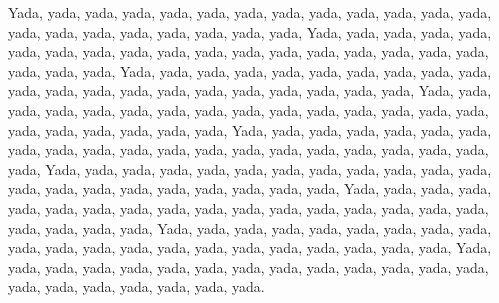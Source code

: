 Yada, yada, yada, yada, yada, yada, yada, yada, yada, yada, yada, yada, yada, yada, yada, yada, yada, yada, yada, yada, yada,
Yada, yada, yada, yada, yada, yada, yada, yada, yada, yada, yada, yada, yada, yada, yada, yada, yada, yada, yada, yada, yada,
Yada, yada, yada, yada, yada, yada, yada, yada, yada, yada, yada, yada, yada, yada, yada, yada, yada, yada, yada, yada, yada,
Yada, yada, yada, yada, yada, yada, yada, yada, yada, yada, yada, yada, yada, yada, yada, yada, yada, yada, yada, yada, yada,
Yada, yada, yada, yada, yada, yada, yada, yada, yada, yada, yada, yada, yada, yada, yada, yada, yada, yada, yada, yada, yada,
Yada, yada, yada, yada, yada, yada, yada, yada, yada, yada, yada, yada, yada, yada, yada, yada, yada, yada, yada, yada, yada,
Yada, yada, yada, yada, yada, yada, yada, yada, yada, yada, yada, yada, yada, yada, yada, yada, yada, yada, yada, yada, yada,
Yada, yada, yada, yada, yada, yada, yada, yada, yada, yada, yada, yada, yada, yada, yada, yada, yada, yada, yada, yada, yada,
Yada, yada, yada, yada, yada, yada, yada, yada, yada, yada, yada, yada, yada, yada, yada, yada, yada, yada, yada, yada, yada.
